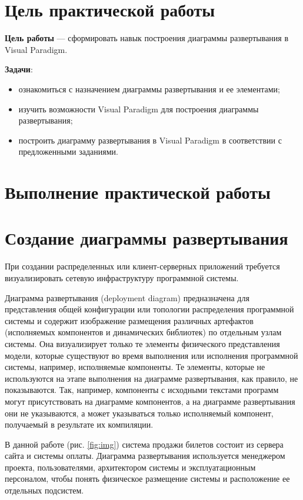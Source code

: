 \graphicspath{{./img}} %

\section*{\LARGE Цель практической работы}

\textbf{Цель работы} --- сформировать навык построения диаграммы
развертывания в Visual Paradigm.

\textbf{Задачи}:
\begin{itemize}
	\item ознакомиться с назначением диаграммы развертывания и ее
		элементами;
	\item изучить возможности Visual Paradigm для построения
		диаграммы развертывания;
	\item построить диаграмму развертывания в Visual Paradigm в
		соответствии с предложенными заданиями.
\end{itemize}

\clearpage

\section*{\LARGE Выполнение практической работы}
\section{Создание диаграммы развертывания}
При создании распределенных или клиент-серверных приложений
требуется визуализировать сетевую инфраструктуру программной системы.\par
Диаграмма развертывания (deployment diagram) предназначена для
представления общей конфигурации или топологии распределения
программной системы и содержит изображение размещения различных
артефактов (исполняемых компонентов и динамических библиотек) по
отдельным узлам системы. Она визуализирует только те элементы физического
представления модели, которые существуют во время выполнения или
исполнения программной системы, например, исполняемые компоненты. Те
элементы, которые не используются на этапе выполнения на диаграмме
развертывания, как правило, не показываются. Так, например, компоненты с
исходными текстами программ могут присутствовать на диаграмме
компонентов, а на диаграмме развертывания они не указываются, а может
указываться только исполняемый компонент, получаемый в результате их
компиляции.\par
В данной работе (рис. \ref{fig:img}) система продажи билетов состоит
из сервера сайта и системы оплаты.
Диаграмма развертывания используется менеджером проекта, пользователями,
архитектором системы и эксплуатационным персоналом, чтобы понять
физическое размещение системы и расположение ее отдельных подсистем.

